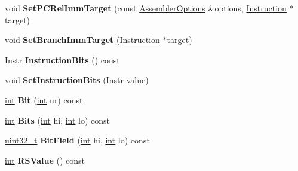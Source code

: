 \begin{DoxyCompactItemize}
\item 
\mbox{\label{classv8_1_1internal_1_1Instruction_a2561c9163e5d5dfa3f4f124b3e3859fa}} 
void {\bfseries Set\+P\+C\+Rel\+Imm\+Target} (const \mbox{\hyperlink{structv8_1_1internal_1_1AssemblerOptions}{Assembler\+Options}} \&options, \mbox{\hyperlink{classv8_1_1internal_1_1Instruction}{Instruction}} $\ast$target)
\item 
\mbox{\label{classv8_1_1internal_1_1Instruction_ace63485d6bbbb8121c18d46aed973ef3}} 
void {\bfseries Set\+Branch\+Imm\+Target} (\mbox{\hyperlink{classv8_1_1internal_1_1Instruction}{Instruction}} $\ast$target)
\item 
\mbox{\label{classv8_1_1internal_1_1Instruction_a073ca49bc4fd2394c1e75829f49625d1}} 
Instr {\bfseries Instruction\+Bits} () const
\item 
\mbox{\label{classv8_1_1internal_1_1Instruction_a09df19b9577ff4a002c4f775b018d7a0}} 
void {\bfseries Set\+Instruction\+Bits} (Instr value)
\item 
\mbox{\label{classv8_1_1internal_1_1Instruction_aeed143f6d56aee73a4eeca0496f8487d}} 
\mbox{\hyperlink{classint}{int}} {\bfseries Bit} (\mbox{\hyperlink{classint}{int}} nr) const
\item 
\mbox{\label{classv8_1_1internal_1_1Instruction_a7a87cc79130522edf745bc8be42b08ea}} 
\mbox{\hyperlink{classint}{int}} {\bfseries Bits} (\mbox{\hyperlink{classint}{int}} hi, \mbox{\hyperlink{classint}{int}} lo) const
\item 
\mbox{\label{classv8_1_1internal_1_1Instruction_a4b701d6ed2836af75836629a06baca6f}} 
\mbox{\hyperlink{classuint32__t}{uint32\+\_\+t}} {\bfseries Bit\+Field} (\mbox{\hyperlink{classint}{int}} hi, \mbox{\hyperlink{classint}{int}} lo) const
\item 
\mbox{\label{classv8_1_1internal_1_1Instruction_a6f38512f694a74b28c6a9a568f4d2f48}} 
\mbox{\hyperlink{classint}{int}} {\bfseries R\+S\+Value} () const

\end{DoxyCompactItemize}
